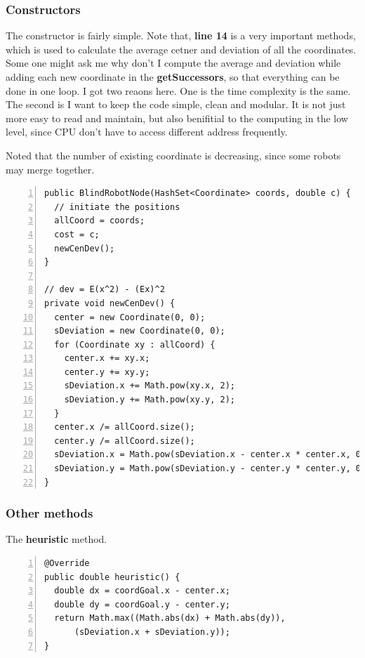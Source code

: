 \documentclass{article}
\begin{document}
\subsubsection{Constructors}
The constructor is fairly simple. Note that, \textbf{line 14} is a very important methods, which is used to calculate the average cetner and deviation of all the coordinates. Some one might ask me why don't I compute the average and deviation while adding each new coordinate in the \textbf{getSuccessors}, so that everything can be done in one loop.  I got two reaons here. One is the time complexity is the same. The second is I want to keep the code simple, clean and modular. It is not just more easy to read and maintain, but also benifitial to the computing in the low level, since CPU don't have to access different address frequently.

Noted that the number of existing coordinate is decreasing, since some robots may merge together.
\begin{lstlisting}[numbers=left]
public BlindRobotNode(HashSet<Coordinate> coords, double c) {
  // initiate the positions
  allCoord = coords;
  cost = c;
  newCenDev();
}

// dev = E(x^2) - (Ex)^2
private void newCenDev() {
  center = new Coordinate(0, 0);
  sDeviation = new Coordinate(0, 0);
  for (Coordinate xy : allCoord) {
    center.x += xy.x;
    center.y += xy.y;
    sDeviation.x += Math.pow(xy.x, 2);
    sDeviation.y += Math.pow(xy.y, 2);
  }
  center.x /= allCoord.size();
  center.y /= allCoord.size();
  sDeviation.x = Math.pow(sDeviation.x - center.x * center.x, 0.5);
  sDeviation.y = Math.pow(sDeviation.y - center.y * center.y, 0.5);
}
\end{lstlisting}

\subsubsection{Other methods}



The \textbf{heuristic} method.
\begin{lstlisting}[numbers=left]
@Override
public double heuristic() {
  double dx = coordGoal.x - center.x;
  double dy = coordGoal.y - center.y;
  return Math.max((Math.abs(dx) + Math.abs(dy)),
      (sDeviation.x + sDeviation.y));
}
\end{lstlisting}
\end{document}
